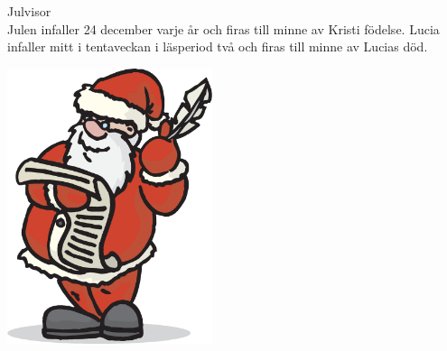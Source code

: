 \begin{flushleft}
{\Huge Julvisor\\}
{\Large
\vspace{1cm}
Julen infaller 24 december varje år och firas till minne av Kristi
födelse. Lucia infaller mitt i tentaveckan i läsperiod två och firas
till minne av Lucias död.}
\end{flushleft}
\vspace{2cm}
\begin{center}
\includegraphics[width=6cm]{bilder/112.eps}

\end{center}

\newpage


\newpage




\newpage




\newpage


\newpage

